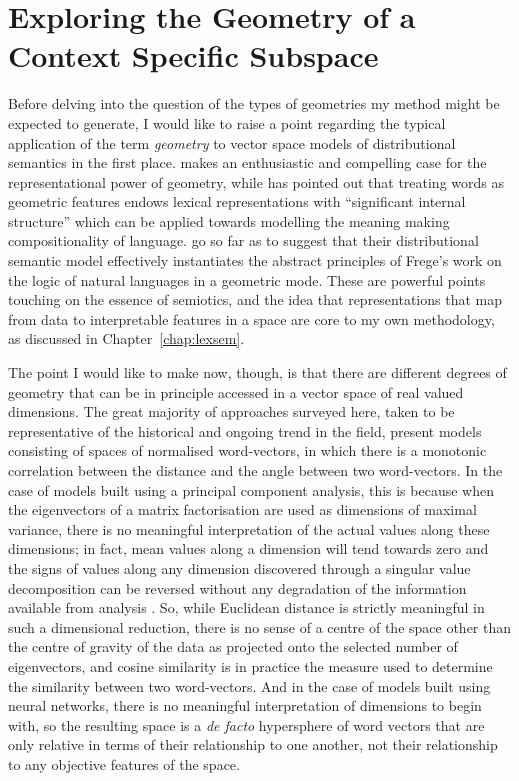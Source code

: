 \section{Exploring the Geometry of a Context Specific Subspace}
Before delving into the question of the types of geometries my method might be expected to generate, I would like to raise a point regarding the typical application of the term \emph{geometry} to vector space models of distributional semantics in the first place.  \cite{Widdows2004} makes an enthusiastic and compelling case for the representational power of geometry, while \citeauthor{Clark2015} has pointed out that treating words as geometric features endows lexical representations with ``significant internal structure'' \citep[][p. 509]{Clark2015} which can be applied towards modelling the meaning making compositionality of language.  \cite{BaroniEA2014b} go so far as to suggest that their distributional semantic model effectively instantiates the abstract principles of Frege's work on the logic of natural languages \citep{Dummett1981} in a geometric mode.  These are powerful points touching on the essence of semiotics, and the idea that representations that map from data to interpretable features in a space are core to my own methodology, as discussed in Chapter~\ref{chap:lexsem}.

The point I would like to make now, though, is that there are different degrees of geometry that can be in principle accessed in a vector space of real valued dimensions.  The great majority of approaches surveyed here, taken to be representative of the historical and ongoing trend in the field, present models consisting of spaces of normalised word-vectors, in which there is a monotonic correlation between the distance and the angle between two word-vectors.  In the case of models built using a principal component analysis, this is because when the eigenvectors of a matrix factorisation are used as dimensions of maximal variance, there is no meaningful interpretation of the actual values along these dimensions; in fact, mean values along a dimension will tend towards zero and the signs of values along any dimension discovered through a singular value decomposition can be reversed without any degradation of the information available from analysis \citep{AbdiEA2010}.  So, while Euclidean distance is strictly meaningful in such a dimensional reduction, there is no sense of a centre of the space other than the centre of gravity of the data as projected onto the selected number of eigenvectors, and cosine similarity is in practice the measure used to determine the similarity between two word-vectors.  And in the case of models built using neural networks, there is no meaningful interpretation of dimensions to begin with, so the resulting space is a \emph{de facto} hypersphere of word vectors that are only relative in terms of their relationship to one another, not their relationship to any objective features of the space.


